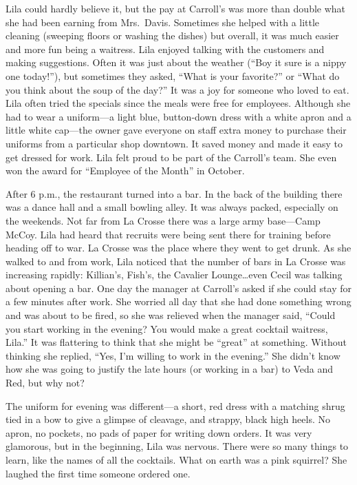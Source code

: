 \documentclass[
  american,
  letterpaper,
]{book}
\begin{document}
Lila could hardly believe it, but the pay at Carroll's was more than
double what she had been earning from Mrs.~Davis. Sometimes she helped
with a little cleaning (sweeping floors or washing the dishes) but
overall, it was much easier and more fun being a waitress. Lila enjoyed
talking with the customers and making suggestions. Often it was just
about the weather (``Boy it sure is a nippy one today!''), but sometimes
they asked, ``What is your favorite?'' or ``What do you think about the
soup of the day?'' It was a joy for someone who loved to eat. Lila often
tried the specials since the meals were free for employees. Although she
had to wear a uniform---a light blue, button-down dress with a white
apron and a little white cap---the owner gave everyone on staff extra
money to purchase their uniforms from a particular shop downtown. It
saved money and made it easy to get dressed for work. Lila felt proud to
be part of the Carroll's team. She even won the award for ``Employee of
the Month'' in October.

After 6 p.m., the restaurant turned into a bar. In the back of the
building there was a dance hall and a small bowling alley. It was always
packed, especially on the weekends. Not far from La Crosse there was a
large army base---Camp McCoy. Lila had heard that recruits were being
sent there for training before heading off to war. La Crosse was the
place where they went to get drunk. As she walked to and from work, Lila
noticed that the number of bars in La Crosse was increasing rapidly:
Killian's, Fish's, the Cavalier Lounge\ldots even Cecil was talking
about opening a bar. One day the manager at Carroll's asked if she could
stay for a few minutes after work. She worried all day that she had done
something wrong and was about to be fired, so she was relieved when the
manager said, ``Could you start working in the evening? You would make a
great cocktail waitress, Lila.'' It was flattering to think that she
might be ``great'' at something. Without thinking she replied, ``Yes,
I'm willing to work in the evening.'' She didn't know how she was going
to justify the late hours (or working in a bar) to Veda and Red, but why
not?

The uniform for evening was different---a short, red dress with a
matching shrug tied in a bow to give a glimpse of cleavage, and strappy,
black high heels. No apron, no pockets, no pads of paper for writing
down orders. It was very glamorous, but in the beginning, Lila was
nervous. There were so many things to learn, like the names of all the
cocktails. What on earth was a pink squirrel? She laughed the first time
someone ordered one.
\end{document}
